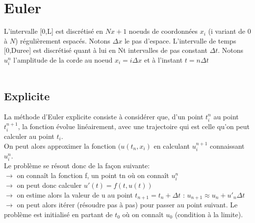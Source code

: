 \section{Euler}

L'intervalle [0,L] est discrétisé en $Nx+1$ noeuds de coordonnées $x_{i}$ (i variant de 0 à $N$) régulièrement espacés. Notons $\Delta x$ le pas d'espace. L'intervalle de temps [0,Duree] est discrétisé quant à lui en Nt intervalles de pas constant $\Delta t$. Notons $u^{n}_{i}$ l'amplitude de la corde au noeud $x_{i} = i\Delta x$ et à l'instant $t = n\Delta t$\\\\

\subsection{Explicite}

La méthode d'Euler explicite consiste à considérer que, d'un point $t^n_{i}$ au point $t^{n+1}_{i}$, la fonction évolue linéairement, avec une trajectoire qui est celle qu'on peut calculer au point $t_i$.\\
On peut alors approximer la fonction $(u(t_n,x_i)$ en  calculant $u^{n+1}_{i}$ connaissant $u^n_{i}$.\\


Le problème se résout donc de la façon suivante:\\
$\rightarrow$ on connaît la fonction f, un point tn où on connaît $u^n_{i}$\\
$\rightarrow$ on peut donc calculer $u'(t)=f(t,u(t))$ \\
$\rightarrow$ on estime alors la valeur de u au point $t_{n+1} = t_n + \Delta t$ : $u_{n+1} \approx u_n + u'_n\Delta t$\\
$\rightarrow$ on peut alors itérer (résoudre pas à pas) pour passer au point suivant. Le problème est initialisé en partant de $t_0$ où on connaît $u_0$ (condition à la limite).\\


